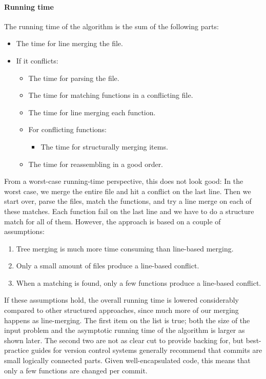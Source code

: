 \documentclass[11pt]{article}
\begin{document}
\paragraph{Running time} The running time of the algorithm is the sum of the following parts:

\begin{itemize}
\item The time for line merging the file.
\item If it conflicts:
\begin{itemize}
\item The time for parsing the file.
\item The time for matching functions in a conflicting file.
\item The time for line merging each function.
\item For conflicting functions:
\begin{itemize}
\item The time for structurally merging items.
\end{itemize}
\item The time for reassembling in a good order.
\end{itemize}
\end{itemize}

From a worst-case running-time perspective, this does not look good: In the worst case, we merge the entire file and hit a conflict on the last line. Then we start over, parse the files, match the functions, and try a line merge on each of these matches. Each function fail on the last line and we have to do a structure match for all of them. However, the approach is based on a couple of assumptions:

\begin{enumerate}
	\item Tree merging is much more time consuming than line-based merging.
	\item Only a small amount of files produce a line-based conflict.
	\item When a matching is found, only a few functions produce a line-based conflict.
\end{enumerate}

If these assumptions hold, the overall running time is lowered considerably compared to other structured approaches, since much more of our merging happens as line-merging. The first item on the list is true; both the size of the input problem and the asymptotic running time of the algorithm is larger as shown later. The second two are not as clear cut to provide backing for, but best-practice guides for version control systems generally recommend that commits are small logically connected parts. Given well-encapsulated code, this means that only a few functions are changed per commit.
\end{document}
